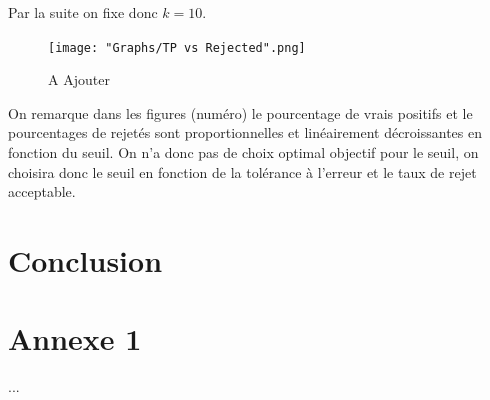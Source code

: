 \documentclass[a4paper,11pt,twoside]{report}
\begin{document}
Par la suite on fixe donc $k=10$.

\begin{figure}[H]
  	\texttt{[image: "Graphs/TP vs Rejected".png]}
  	\caption{A Ajouter}
\end{figure}

	
On remarque dans les figures (numéro) le pourcentage de vrais positifs et le pourcentages de rejetés sont proportionnelles et linéairement décroissantes en fonction du seuil. On n'a donc pas de choix optimal objectif pour le seuil, on choisira donc le seuil en fonction de la tolérance à l'erreur et le taux de rejet acceptable. 


\chapter{Conclusion}

  
\nocite{*} 

%
\cleardoublepage

\appendix

\chapter{Annexe 1}
...
\end{document}

